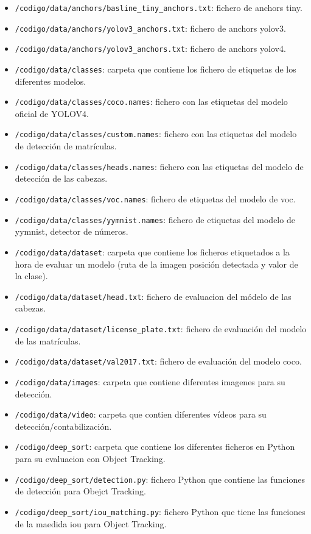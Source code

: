 \begin{itemize}
    \item \texttt{/codigo/data/anchors/basline\_tiny\_anchors.txt}: fichero de anchors tiny.
    \item \texttt{/codigo/data/anchors/yolov3\_anchors.txt}: fichero de anchors yolov3.
    \item \texttt{/codigo/data/anchors/yolov3\_anchors.txt}: fichero de anchors yolov4.
    \item \texttt{/codigo/data/classes}: carpeta que contiene los fichero de etiquetas de los diferentes modelos.
    \item \texttt{/codigo/data/classes/coco.names}: fichero con las etiquetas del modelo oficial de YOLOV4.
    \item \texttt{/codigo/data/classes/custom.names}: fichero con las etiquetas del modelo de detección de matrículas.
    \item \texttt{/codigo/data/classes/heads.names}: fichero con las etiquetas del modelo de detección de las cabezas.
    \item \texttt{/codigo/data/classes/voc.names}: fichero de etiquetas del modelo de voc.
    \item \texttt{/codigo/data/classes/yymnist.names}: fichero de etiquetas del modelo de yymnist, detector de números.
    \item \texttt{/codigo/data/dataset}: carpeta que contiene los ficheros etiquetados a la hora de evaluar un modelo (ruta de la imagen posición detectada y valor de la clase).
    \item \texttt{/codigo/data/dataset/head.txt}: fichero de evaluacion del módelo de las cabezas. 
    \item \texttt{/codigo/data/dataset/license\_plate.txt}: fichero de evaluación del modelo de las matrículas.
    \item \texttt{/codigo/data/dataset/val2017.txt}: fichero de evaluación del modelo coco.
    \item \texttt{/codigo/data/images}: carpeta que contiene diferentes imagenes para su detección.
    \item \texttt{/codigo/data/video}: carpeta que contien diferentes vídeos para su detección/contabilización.
    \item \texttt{/codigo/deep\_sort}: carpeta que contiene los diferentes ficheros en Python para su evaluacion con Object Tracking.
    \item \texttt{/codigo/deep\_sort/detection.py}: fichero Python que contiene las funciones de detección para Obejct Tracking.
    \item \texttt{/codigo/deep\_sort/iou\_matching.py}: fichero Python que tiene las funciones de la maedida iou para Object Tracking.

\end{itemize}
